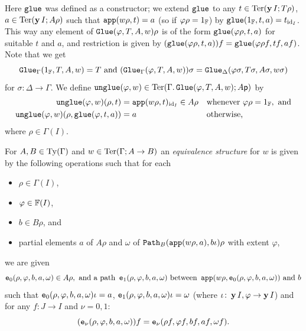 Here $\operatorname{\mathtt{glue}}$ was defined as a constructor; we extend $\operatorname{\mathtt{glue}}$ to any
$t \in \operatorname{Ter} (\operatorname{\mathbf{y}} I; T \rho)$, $a \in \operatorname{Ter} (\operatorname{\mathbf{y}} I; A \rho)$
such that $\operatorname{\mathtt{app}} (w \rho,t) = a$ (so if $\varphi \rho = 1_{\mathbb{F}}$) by
$\operatorname{\mathtt{glue}} (1_{\mathbb{F}}, t, a) = t_{\mathrm{id}_I}$.  This way any element of $\operatorname{\mathtt{Glue}}
(\varphi,T,A,w) \rho$ is of the form $\operatorname{\mathtt{glue}} (\varphi \rho, t, a)$ for
suitable $t$ and $a$, and restriction is given by $(\operatorname{\mathtt{glue}} (\varphi
\rho, t, a)) f = \operatorname{\mathtt{glue}} (\varphi \rho f, t f, a f)$.  Note that we get
\begin{equation}
  \label{eq:sglue}
  \sGlue_\Gamma (1_\FF, T, A, w) = T \text{ and } %
  (\sGlue_\Gamma (\varphi, T, A, w)) \sigma = %
  \sGlue_\Delta (\varphi \sigma, T \sigma, A \sigma, w \sigma)
\end{equation}
for $\sigma \colon \Delta \to \Gamma$.  We define $\operatorname{\mathtt{unglue}}(\varphi,w)
\in \operatorname{Ter} (\Gamma.\operatorname{\mathtt{Glue}} (\varphi,T,A,w); A {\sf p})$ by
\begin{align*}
  \operatorname{\mathtt{unglue}} (\varphi,w) (\rho, t) &= \operatorname{\mathtt{app}}(w \rho, t)_{\mathrm{id}_I} \in A \rho
  &&\text{whenever }\varphi \rho = 1_{\mathbb{F}}, \text{ and}
  \\
  \operatorname{\mathtt{unglue}} (\varphi,w) (\rho, \operatorname{\mathtt{glue}} (\varphi,t,a)) &= a &&
  \text{otherwise,}
\end{align*}
where $\rho \in \Gamma (I)$.

\begin{definition}
  \label{def:equiv-structure}
  For $A, B \in \operatorname{Ty} (\Gamma)$ and $w \in \operatorname{Ter} (\Gamma; A \to B)$ an
  \emph{equivalence structure} for $w$ is given by the following
  operations such that for each
  \begin{itemize}
  \item $\rho \in \Gamma (I)$,
  \item $\varphi \in \mathbb{F} (I)$,
  \item $b \in B \rho$, and
  \item partial elements $a$ of $A\rho$ and $\omega$ of $\mathtt{Path}_B(\operatorname{\mathtt{app}}
    (w \rho,a),b \iota) \rho$ with extent $\varphi$,
  \end{itemize}
  we are given
  \[
  \operatorname{\mathtt{e}}_0 (\rho,\varphi,b,a,\omega) \in A \rho, \text{ and a path }
  \operatorname{\mathtt{e}}_1 (\rho,\varphi,b,a,\omega) \text{ between }\operatorname{\mathtt{app}} (w \rho,
  \operatorname{\mathtt{e}}_0 (\rho,\varphi,b,a,\omega)) \text{ and }b
  \]
  such that $\operatorname{\mathtt{e}}_0 (\rho,\varphi,b,a,\omega) \iota = a$,
  $\operatorname{\mathtt{e}}_1 (\rho,\varphi,b,a,\omega) \iota = \omega$ (where $\iota
  \colon \operatorname{\mathbf{y}} I, \varphi \to \operatorname{\mathbf{y}} I$) and for any $f \colon J
  \to I$ and $\nu = 0,1$:
  \[
  (\operatorname{\mathtt{e}}_\nu (\rho,\varphi,b,a,\omega)) f = \operatorname{\mathtt{e}}_\nu (\rho f,\varphi
  f,b f,a f,\omega f).
  \]
\end{definition}

